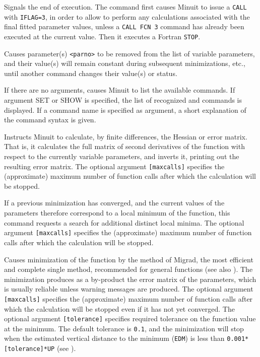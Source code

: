 
Signals the end of execution.
The  command first causes Minuit to issue a
\texttt{CALL}~ with \texttt{IFLAG=3},
in order to allow  to perform any calculations associated with
the final fitted parameter values,
unless a \texttt{CALL FCN 3} command has already been executed
at the current  value.
Then it executes a Fortran \texttt{STOP}.


Causes parameter(s) \texttt{<parno>} to be removed from the list of variable
parameters, and their value(s) will remain constant
during subsequent minimizations, etc., until another command changes
their value(s) or status.


If there are no arguments, causes Minuit to list the available commands. 
If argument SET or SHOW is specified, the list of recognized
 and  commands is displayed.
If a command name is specified as argument, a short explanation of the
command syntax is given.


Instructs Minuit to calculate, by finite differences, the Hessian or
error matrix. That is, it calculates the full matrix of second
derivatives of the function with respect to the currently variable
parameters, and inverts it, printing out the resulting error matrix.
The optional argument \texttt{[maxcalls]} specifies the (approximate) maximum
number of function calls after which the calculation will be stopped.


If a previous minimization has converged, and the current values
of the parameters therefore correspond to a local minimum of the function,
this command requests a search for additional distinct local minima.
The optional argument \texttt{[maxcalls]} specifies the (approximate) maximum
number of function calls after which the calculation will be stopped.


Causes minimization of the function by the method of Migrad, the most
efficient and complete single method, recommended for general functions
(see also ).
The minimization produces as a by-product the error matrix
of the parameters, which is usually reliable unless warning messages
are produced.
The optional argument \texttt{[maxcalls]} specifies the (approximate) maximum
number of function calls after which the calculation will be stopped
even if it has not yet converged.
The optional argument \texttt{[tolerance]} specifies required tolerance on the
function value at the minimum.  The default tolerance is \texttt{0.1}, and the
minimization will stop when the estimated vertical distance to
the minimum (\texttt{EDM}) is less than \texttt{0.001*[tolerance]*UP} 
(see ).

